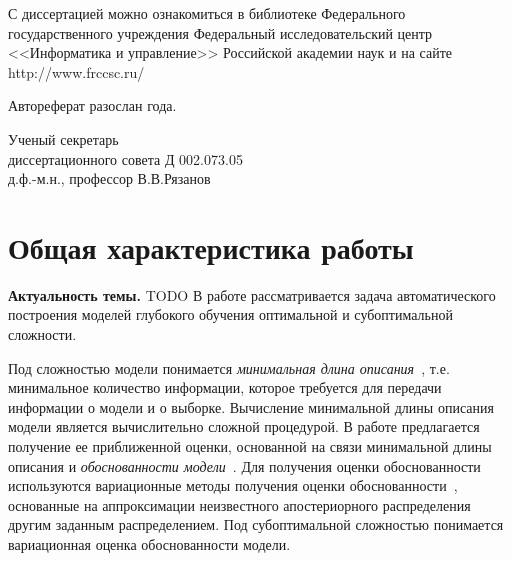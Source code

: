 \documentclass[11pt, a5paper]{dissert}
\theoremstyle{definition}
\begin{document}
{\vspace{0.2cm}
\noindent С диссертацией можно ознакомиться в библиотеке Федерального государственного учреждения Федеральный исследовательский центр <<Информатика и управление>> Российской академии наук и на сайте http://www.frccsc.ru/

\vspace{0.2cm}
\noindent Автореферат разослан  \quad {} года.

\vspace{0.3cm}
\noindent Ученый секретарь\\
диссертационного совета Д 002.073.05\\
д.ф.-м.н., профессор
\hspace{9cm} В.В.Рязанов
}

\clearpage





\section*{Общая характеристика работы}
\label{ch:Introduction}

\textbf{Актуальность темы.}
TODO В работе рассматривается задача автоматического построения моделей глубокого обучения оптимальной и субоптимальной сложности. 

Под сложностью модели понимается \emph{минимальная длина описания}~\cite{mdl}, т.е. минимальное количество информации, которое требуется для передачи информации о модели и о выборке. Вычисление минимальной длины описания модели является вычислительно сложной процедурой. В работе предлагается получение ее приближенной оценки, основанной на связи минимальной длины описания и \emph{обоснованности модели}~\cite{mdl}. Для получения оценки обоснованности используются вариационные методы получения оценки обоснованности~\cite{bishop}, основанные на аппроксимации неизвестного апостериорного распределения другим заданным распределением. Под субоптимальной сложностью понимается вариационная оценка обоснованности модели.
\end{document}
